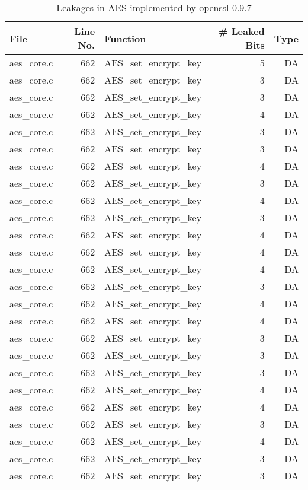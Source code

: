 \begin{table}[h!]
\centering\tiny\scriptsize
\caption{Leakages in AES implemented by openssl 0.9.7}\label{tab:AESopenssl0.9.7}
\begin{tabular}{lrlrr}
\hline
\textbf{File} & \textbf{Line No.} & \textbf{Function} & \textbf{\# Leaked Bits} & \textbf{Type} \\\hline
aes\_core.c& 662&AES\_set\_encrypt\_key&5 &DA\\
aes\_core.c& 662&AES\_set\_encrypt\_key&3 &DA\\
aes\_core.c& 662&AES\_set\_encrypt\_key&3 &DA\\
aes\_core.c& 662&AES\_set\_encrypt\_key&4 &DA\\
aes\_core.c& 662&AES\_set\_encrypt\_key&3 &DA\\
aes\_core.c& 662&AES\_set\_encrypt\_key&3 &DA\\
aes\_core.c& 662&AES\_set\_encrypt\_key&4 &DA\\
aes\_core.c& 662&AES\_set\_encrypt\_key&3 &DA\\
aes\_core.c& 662&AES\_set\_encrypt\_key&4 &DA\\
aes\_core.c& 662&AES\_set\_encrypt\_key&3 &DA\\
aes\_core.c& 662&AES\_set\_encrypt\_key&4 &DA\\
aes\_core.c& 662&AES\_set\_encrypt\_key&4 &DA\\
aes\_core.c& 662&AES\_set\_encrypt\_key&4 &DA\\
aes\_core.c& 662&AES\_set\_encrypt\_key&3 &DA\\
aes\_core.c& 662&AES\_set\_encrypt\_key&4 &DA\\
aes\_core.c& 662&AES\_set\_encrypt\_key&4 &DA\\
aes\_core.c& 662&AES\_set\_encrypt\_key&3 &DA\\
aes\_core.c& 662&AES\_set\_encrypt\_key&3 &DA\\
aes\_core.c& 662&AES\_set\_encrypt\_key&3 &DA\\
aes\_core.c& 662&AES\_set\_encrypt\_key&4 &DA\\
aes\_core.c& 662&AES\_set\_encrypt\_key&4 &DA\\
aes\_core.c& 662&AES\_set\_encrypt\_key&3 &DA\\
aes\_core.c& 662&AES\_set\_encrypt\_key&4 &DA\\
aes\_core.c& 662&AES\_set\_encrypt\_key&3 &DA\\
aes\_core.c& 662&AES\_set\_encrypt\_key&3 &DA\\

\end{tabular}
\end{table}
